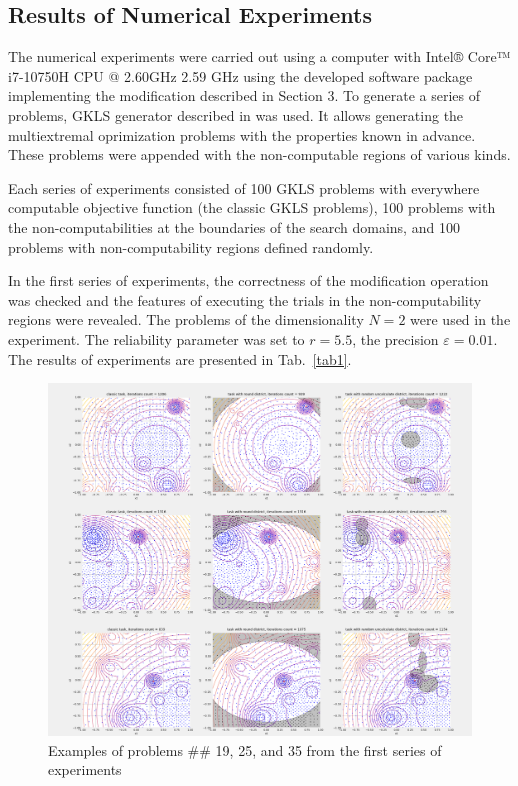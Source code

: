 \documentclass[runningheads]{llncs}
\begin{document}
\subsection{Results of Numerical Experiments}
The numerical experiments were carried out using a computer with Intel® Core™ i7-10750H CPU @ 2.60GHz 2.59 GHz using the developed software package implementing the modification described in Section 3. To generate a series of problems, GKLS generator described in \cite{Gaviano2003} was used. It allows generating the multiextremal oprimization problems with the properties known in advance. These problems were appended with the non-computable regions of various kinds.

Each series of experiments consisted of 100 GKLS problems with everywhere computable objective function (the classic GKLS problems), 100 problems with the non-computabilities at the boundaries of the search domains, and 100 problems with non-computability regions defined randomly.

In the first series of experiments, the correctness of the modification operation was checked and the features of executing the trials in the non-computability regions were revealed. The problems of the dimensionality $N=2$ were used in the experiment. The reliability parameter was set to $r=5.5$, the precision $\varepsilon=0.01$. The results of experiments are presented in Tab.~\ref{tab1}.

\begin{figure}
\includegraphics[width=\textwidth]{fig6.png}
\caption{Examples of problems \#\# 19, 25, and 35 from the first series of experiments} \label{fig6}
\end{figure}
\end{document}
